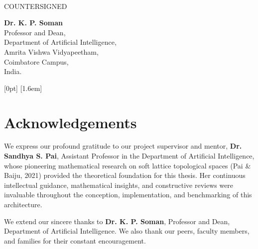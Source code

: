 \documentclass[a4paper, 12pt]{report}
\theoremstyle{definition}
\begin{document}
	\vspace*{1.0cm}
	 \\
	\vfill
	\begin{center}
		\large{COUNTERSIGNED}\\
	\end{center}
	\vspace{0.2in}
	
    \begin{center}
		\textbf{Dr. K. P. Soman}\\
		Professor and Dean, \\ 
		Department of Artificial Intelligence,\\ 
        Amrita Vishwa Vidyapeetham,\\
        Coimbatore Campus,\\
        India.
    \end{center}
	
	\clearpage
	
	\begingroup
	\singlespacing
	\setlength{\parskip}{0pt}
	[0pt]{\vspace{4pt}\bfseries}{\contentslabel{1.6em}}{}{\dotfill\contentspage}
	[1.6em]{\vspace{1pt}}{\contentslabel{2.3em}}{}{\dotfill\contentspage}
	\tableofcontents
	\endgroup
	
	\clearpage
	\chapter*{Acknowledgements}
	We express our profound gratitude to our project supervisor and mentor, \textbf{Dr. Sandhya S. Pai}, Assistant Professor in the Department of Artificial Intelligence, whose pioneering mathematical research on soft lattice topological spaces (Pai \& Baiju, 2021) provided the theoretical foundation for this thesis. Her continuous intellectual guidance, mathematical insights, and constructive reviews were invaluable throughout the conception, implementation, and benchmarking of this architecture.

    We extend our sincere thanks to \textbf{Dr. K. P. Soman}, Professor and Dean, Department of Artificial Intelligence. We also thank our peers, faculty members, and families for their constant encouragement.
\end{document}
